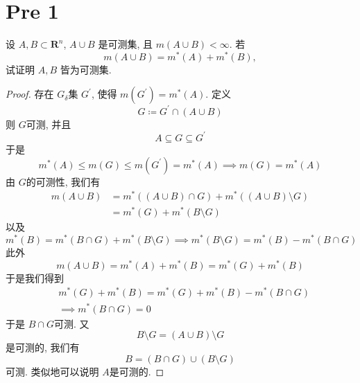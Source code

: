 \documentclass[../main.tex]{subfiles}
\begin{document}
\ifSubfilesClassLoaded{

    \tableofcontents
    
}{}

\chapter{ Pre 1 }
\begin{exercise}{}{}
设 $A,B \subset \mathbf{R}^n$, $A \cup B$ 是可测集, 且 $m(A \cup B) < \infty$. 若
\[m(A \cup B) = m^*(A) + m^*(B),\]
试证明 $A,B$ 皆为可测集.
\end{exercise}

\begin{proof}
    存在 \(  G_{ \delta }  \)集 \(  G^{\prime}   \), 使得 \(  m  \left( G^{\prime}  \right)= m^{*}\left( A \right)  \). 定义 \[
    G\coloneqq G^{\prime} \cap \left( A\cup B \right) 
    \]则 \(  G  \)可测, 并且  \[
    A\subseteq G\subseteq G^{\prime} 
    \]   于是 \[
    m^{*}\left( A \right)\le  m\left( G \right)\le m \left( G^{\prime}  \right)= m^{*}\left( A \right)\implies m\left( G \right)= m^{*}\left( A \right)    
    \]由 \(  G  \)的可测性, 我们有 \[
  \begin{aligned}
  m\left( A\cup B \right)&= m^{*}\left( \left( A\cup B \right)\cap G  \right)+ m^{*}\left( \left( A\cup B \right)\setminus G  \right)  \\ 
   &=  m^{*}\left( G \right)+ m^{*}\left( B\setminus G \right)  
  \end{aligned}  
    \] 以及 \[
    m^{*}\left( B \right)= m^{*}\left( B\cap G\right)+ m^{*}\left( B\setminus G \right)   \implies m^{*}\left( B\setminus G \right)= m^{*}\left( B \right)-m^{*}\left( B\cap G \right)   
    \]此外 \[
    m\left( A\cup B \right)= m^{*}\left( A \right)+ m^{*}\left( B \right)= m^{*}\left( G \right)+ m^{*}\left( B \right)     
    \]于是我们得到 \[
    \begin{aligned}
   & m^{*}\left( G \right)+ m^{*}\left( B \right)= m^{*}\left( G \right)+ m^{*}\left( B \right)-m^{*}\left( B\cap G \right)    \\ 
    &\implies m^{*}\left( B\cap G \right)= 0 
    \end{aligned}
    \]于是 \(  B\cap G  \)可测. 又 \[
    B\setminus G= \left( A\cup B \right)\setminus G 
    \]是可测的, 我们有 \[
    B= \left( B\cap G \right)\cup \left( B\setminus G \right)  
    \] 可测. 类似地可以说明 \(  A  \)是可测的. 
\end{proof}
\end{document}
